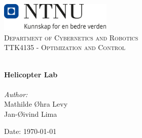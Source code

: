 
\begin{titlepage}
\vbox{ }
\vbox{ }
\begin{center}
\includegraphics[width=0.40\textwidth]{Images/NTNU_logo.png}\\[1cm]
\textsc{\LARGE Department of Cybernetics and Robotics}\\[1.5cm]
\textsc{\Large TTK4135 - Optimization and Control}\\[0.5cm]
\vbox{ }

\HRule \\[0.4cm]
{ \huge \bfseries Helicopter Lab}\\[0.4cm]
\HRule \\[1.5cm]

\large
\emph{Author:}\\
Mathilde Øhra Levy\\
Jan-Øivind Lima
\vfill

{\large Date: \today}
\end{center}
\end{titlepage}
